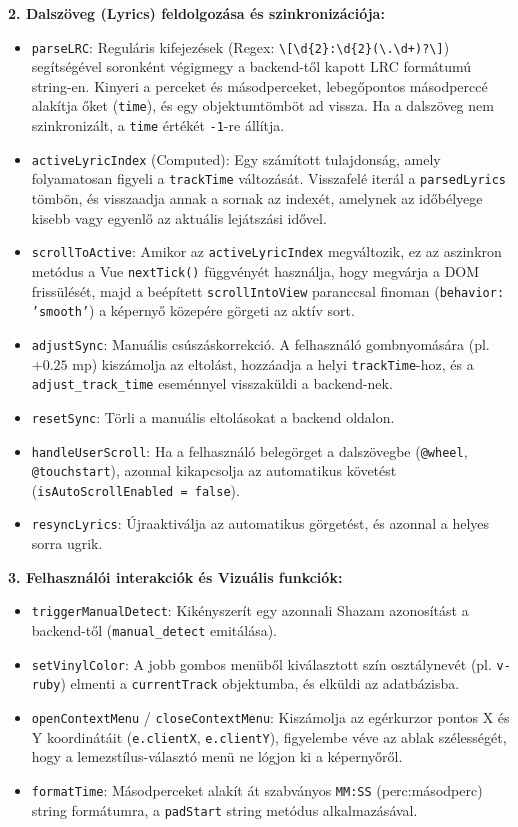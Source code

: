 \textbf{2. Dalszöveg (Lyrics) feldolgozása és szinkronizációja:}
\begin{itemize}
    \item \texttt{parseLRC}: Reguláris kifejezések (Regex: \texttt{\textbackslash[\textbackslash d\{2\}:\textbackslash d\{2\}(\textbackslash.\textbackslash d+)?\textbackslash]}) segítségével soronként végigmegy a backend-től kapott LRC formátumú string-en. Kinyeri a perceket és másodperceket, lebegőpontos másodperccé alakítja őket (\texttt{time}), és egy objektumtömböt ad vissza. Ha a dalszöveg nem szinkronizált, a \texttt{time} értékét \texttt{-1}-re állítja.
    \item \texttt{activeLyricIndex} (Computed): Egy számított tulajdonság, amely folyamatosan figyeli a \texttt{trackTime} változását. Visszafelé iterál a \texttt{parsedLyrics} tömbön, és visszaadja annak a sornak az indexét, amelynek az időbélyege kisebb vagy egyenlő az aktuális lejátszási idővel.
    \item \texttt{scrollToActive}: Amikor az \texttt{activeLyricIndex} megváltozik, ez az aszinkron metódus a Vue \texttt{nextTick()} függvényét használja, hogy megvárja a DOM frissülését, majd a beépített \texttt{scrollIntoView} paranccsal finoman (\texttt{behavior: 'smooth'}) a képernyő közepére görgeti az aktív sort.
    \item \texttt{adjustSync}: Manuális csúszáskorrekció. A felhasználó gombnyomására (pl. $+0.25$ mp) kiszámolja az eltolást, hozzáadja a helyi \texttt{trackTime}-hoz, és a \texttt{adjust\_track\_time} eseménnyel visszaküldi a backend-nek.
    \item \texttt{resetSync}: Törli a manuális eltolásokat a backend oldalon.
    \item \texttt{handleUserScroll}: Ha a felhasználó belegörget a dalszövegbe (\texttt{@wheel}, \texttt{@touchstart}), azonnal kikapcsolja az automatikus követést (\texttt{isAutoScrollEnabled = false}).
    \item \texttt{resyncLyrics}: Újraaktiválja az automatikus görgetést, és azonnal a helyes sorra ugrik.
\end{itemize}

\textbf{3. Felhasználói interakciók és Vizuális funkciók:}
\begin{itemize}
    \item \texttt{triggerManualDetect}: Kikényszerít egy azonnali Shazam azonosítást a backend-től (\texttt{manual\_detect} emitálása).
    \item \texttt{setVinylColor}: A jobb gombos menüből kiválasztott szín osztálynevét (pl. \texttt{v-ruby}) elmenti a \texttt{currentTrack} objektumba, és elküldi az adatbázisba.
    \item \texttt{openContextMenu} / \texttt{closeContextMenu}: Kiszámolja az egérkurzor pontos X és Y koordinátáit (\texttt{e.clientX}, \texttt{e.clientY}), figyelembe véve az ablak szélességét, hogy a lemezstílus-választó menü ne lógjon ki a képernyőről.
    \item \texttt{formatTime}: Másodperceket alakít át szabványos \texttt{MM:SS} (perc:másodperc) string formátumra, a \texttt{padStart} string metódus alkalmazásával.
\end{itemize}

